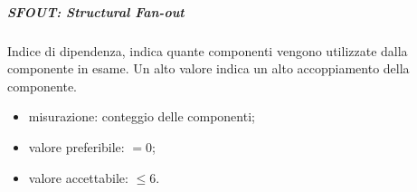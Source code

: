 			\subparagraph{SFOUT: Structural Fan-out}
			Indice di dipendenza, indica quante componenti vengono utilizzate dalla componente in esame. Un alto valore indica un alto
accoppiamento della componente.
			\begin{itemize}
				\item misurazione: conteggio delle componenti;
				\item valore preferibile: $ = 0$;
				\item valore accettabile: $ \leq 6$.
			\end{itemize}
\pagebreak
